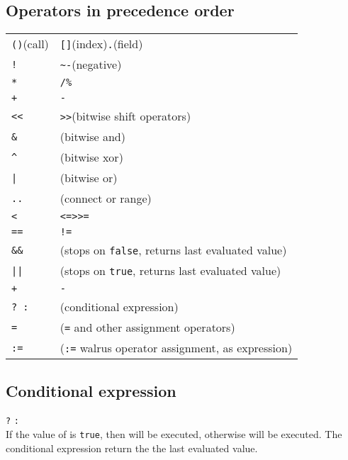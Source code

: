 \subsection*{Operators in precedence order}
\begin{tabular}{@{}ll}
    \texttt{()}(call) & \parbox{5em}{\texttt{[]}(index)}\parbox{5em}{\texttt{.}(field)} \\
    \texttt{!} & \parbox{4em}{\texttt{\textasciitilde}}\parbox{5em}{\texttt{-}(negative)} \\
    \texttt{*} & \parbox{4em}{\texttt{/}}\parbox{4em}{\texttt{\%}} \\
    \texttt{+} & \parbox{4em}{\texttt{-}} \\
    \texttt{<<} & \parbox{4em}{\texttt{>>}}(bitwise shift operators) \\
    \texttt{\&} & (bitwise and) \\
    \texttt{\textasciicircum} & (bitwise xor) \\
    \texttt{|} & (bitwise or) \\
    \texttt{..} & (connect or range) \\
    \texttt{<} & \parbox{4em}{\texttt{<=}}\parbox{4em}{\texttt{>}}\parbox{4em}{\texttt{>=}} \\
    \texttt{==} & \parbox{4em}{\texttt{!=}} \\
    \texttt{\&\&} & (stops on \texttt{false}, returns last evaluated value) \\
    \texttt{||} & (stops on \texttt{true}, returns last evaluated value) \\
    \texttt{+} & \parbox{4em}{\texttt{-}} \\
    \texttt{? :} & (conditional expression) \\
    \texttt{=} & (\texttt{=} and other assignment operators) \\
    \texttt{:=} & (\texttt{:=} walrus operator assignment, as expression) \\
\end{tabular}

\subsection*{Conditional expression}
\hangpar {} \texttt{?}  \texttt{:}  \\
If the value of  is \texttt{true}, then  will be executed, otherwise  will be executed. The conditional expression return the the last evaluated value.
    
